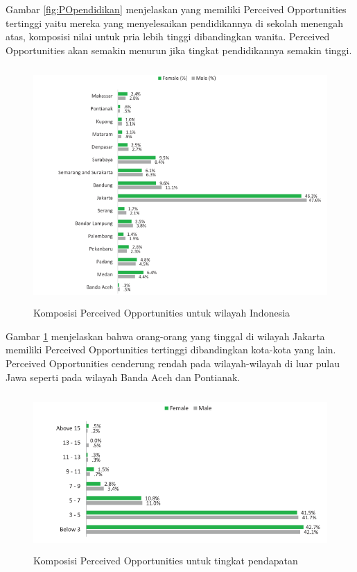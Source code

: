 \begin{enumerate}
Gambar \ref{fig:POpendidikan} menjelaskan yang memiliki Perceived Opportunities tertinggi yaitu mereka yang menyelesaikan pendidikannya di sekolah menengah atas, komposisi nilai untuk pria lebih tinggi dibandingkan wanita. Perceived Opportunities akan semakin menurun jika tingkat pendidikannya semakin tinggi.

\begin{figure} [H]
	\centering  
	\includegraphics[width=13cm, height=9cm]{lokasiPO2013} 
	\caption[Komposisi Perceived Opportunities untuk wilayah Indonesia]{Komposisi Perceived Opportunities untuk wilayah Indonesia} 
	\label{fig:lokasiPO} 
\end{figure}  

Gambar \ref{fig:lokasiPO} menjelaskan bahwa orang-orang yang tinggal di wilayah Jakarta memiliki Perceived Opportunities tertinggi dibandingkan kota-kota yang lain. Perceived Opportunities cenderung rendah pada wilayah-wilayah di luar pulau Jawa seperti pada wilayah Banda Aceh dan Pontianak.

\begin{figure} [H]
	\centering  
	\includegraphics[width=13cm, height=6cm]{pendapatanPO2013} 
	\caption[Komposisi Perceived Opportunities untuk tingkat pendapatan]{Komposisi Perceived Opportunities untuk tingkat pendapatan} 
	\label{fig:pendapatanPO} 
\end{figure} 


\end{enumerate}
